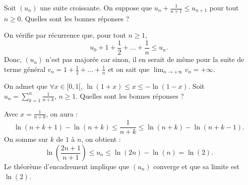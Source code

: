 \begin{question}

Soit $(u_n)$ une suite croissante. On suppose que $\displaystyle u_n+\frac{1}{n+1}\leq u_{n+1}$ pour tout $n\geq 0$. Quelles sont les bonnes réponses ?
\begin{answers} 
\end{answers}
\begin{explanations}
On vérifie par récurrence que, pour tout $n\geq 1$, 
$$\displaystyle u_0+1+\frac{1}{2}+\dots +\frac{1}{n}\leq u_n.$$
Donc, $(u_n)$ n'est pas majorée car sinon, il en serait de même pour la suite de terme général $\displaystyle v_n=1+\frac{1}{2}+\dots +\frac{1}{n}$ et on sait que $\displaystyle \lim _{n\to +\infty}v_n=+\infty$.
\end{explanations}
\end{question}




\begin{question}

On admet que $\forall x \in [0,1[$, $\ln (1+x)\leq x\leq -\ln (1-x)$. Soit $\displaystyle u_n=\sum _{k=1}^n\frac{1}{n+k}$, $n\geq 1$. Quelles sont les bonnes réponses ?
\begin{answers} 
\end{answers}
\begin{explanations}
Avec $\displaystyle x=\frac{1}{n+k}$, on aura :
$$\ln(n+k+1)-\ln (n+k)\leq \frac{1}{n+k}\leq \ln(n+k)-\ln (n+k-1).$$
On somme sur $k$ de $1$ à $n$, on obtient :
$$\ln \left(\frac{2n+1}{n+1}\right)\leq u_n\leq \ln (2n)-\ln (n)=\ln (2).$$
Le théorème d'encadrement implique que $(u_n)$ converge et que sa limite est $\ln (2)$.
\end{explanations}
\end{question}
